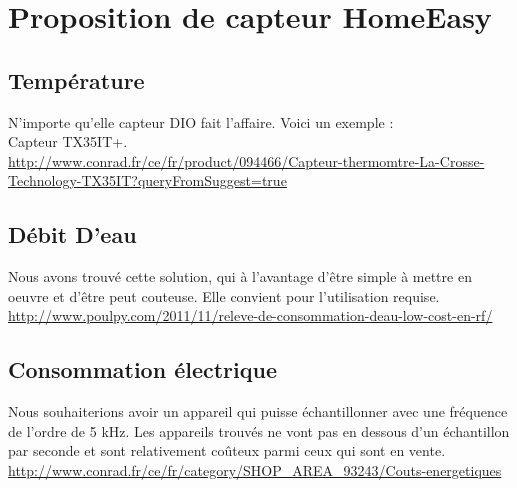 \documentclass[10pt,a4paper]{article}
\begin{document}
\section{Proposition de capteur HomeEasy}
\subsection{Température}
N'importe qu'elle capteur DIO fait l'affaire. Voici un exemple :\\
Capteur TX35IT+.\\
\url{http://www.conrad.fr/ce/fr/product/094466/Capteur-thermomtre-La-Crosse-Technology-TX35IT?queryFromSuggest=true}
\subsection{Débit D'eau}
Nous avons trouvé cette solution, qui à l'avantage d'être simple à mettre en oeuvre et d'être peut couteuse. Elle convient pour l'utilisation requise.\\
\url{http://www.poulpy.com/2011/11/releve-de-consommation-deau-low-cost-en-rf/}

\subsection{Consommation électrique}
Nous souhaiterions avoir un appareil qui puisse échantillonner avec une fréquence de l'ordre de 5 kHz. Les appareils trouvés ne vont pas en dessous d'un échantillon par seconde et sont relativement coûteux parmi ceux qui sont en vente.\\
\url{http://www.conrad.fr/ce/fr/category/SHOP_AREA_93243/Couts-energetiques}
\end{document}
